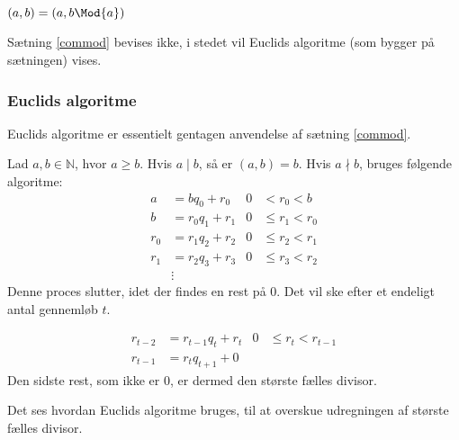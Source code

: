 \begin{sent}
    \label{commod}
    \((a, b) = (a, b \Mod{a})\)
\end{sent}

Sætning \ref{commod} bevises ikke, i stedet vil Euclids algoritme (som bygger på sætningen) vises.

\subsubsection{Euclids algoritme}
Euclids algoritme er essentielt gentagen anvendelse af sætning \ref{commod}.
\begin{definition}
    Lad \(a, b \in \mathbb{N}\), hvor \(a \geq b\).
    Hvis \(a \mid b\), så er \((a, b) = b\).
    Hvis \(a \nmid b\), bruges følgende algoritme:
    \begin{align*}
        a   &= b q_0    + r_0   & 0 &<    r_0 < b\\
        b   &= r_0 q_1  + r_1   & 0 &\leq r_1 < r_0\\
        r_0 &= r_1 q_2  + r_2   & 0 &\leq r_2 < r_1\\
        r_1 &= r_2 q_3  + r_3   & 0 &\leq r_3 < r_2\\
        &\vdots
    \end{align*}
    Denne proces slutter, idet der findes en rest på 0.
    Det vil ske efter et endeligt antal gennemløb \(t\).

    \begin{align*}
        r_{t-2} &= r_{t-1}  q_t      + r_t   & 0 &\leq r_t < r_{t-1}\\
        r_{t-1} &= r_t      q_{t+1}  + 0
    \end{align*}
    Den sidste rest, som ikke er 0, er dermed den største fælles divisor.\cite[11]{absalg}
\end{definition}

Det ses hvordan Euclids algoritme bruges, til at overskue udregningen af største fælles divisor.

